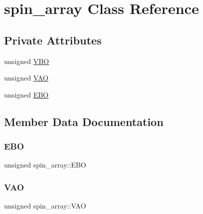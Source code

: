 \hypertarget{classspin__array}{}\section{spin\+\_\+array Class Reference}
\label{classspin__array}
\subsection*{Private Attributes}
\begin{DoxyCompactItemize}
\item 
unsigned \mbox{\hyperlink{classspin__array_abf178d9823e4ae6243d13f5acd119498}{V\+BO}}
\item 
unsigned \mbox{\hyperlink{classspin__array_a30297f4c688d78ed9d1fb5c840ec29c0}{V\+AO}}
\item 
unsigned \mbox{\hyperlink{classspin__array_a39cc2336fd7b613ab2cce54261e34fba}{E\+BO}}
\end{DoxyCompactItemize}


\subsection{Member Data Documentation}
\mbox{\label{classspin__array_a39cc2336fd7b613ab2cce54261e34fba}} 
\subsubsection{\texorpdfstring{E\+BO}{EBO}}
{\footnotesize\ttfamily unsigned spin\+\_\+array\+::\+E\+BO\hspace{0.3cm}{\ttfamily [private]}}

\mbox{\label{classspin__array_a30297f4c688d78ed9d1fb5c840ec29c0}} 
\subsubsection{\texorpdfstring{V\+AO}{VAO}}
{\footnotesize\ttfamily unsigned spin\+\_\+array\+::\+V\+AO\hspace{0.3cm}{\ttfamily [private]}}

\mbox{\label{classspin__array_abf178d9823e4ae6243d13f5acd119498}} 
